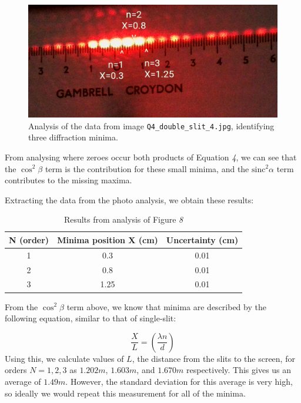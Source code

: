 \documentclass[a4paper]{article}
\begin{document}
\begin{figure}[h!]
\centerline{\includegraphics[scale=0.95]{doubleslit.png}}
\caption{Analysis of the data from image {\lstinline$Q4_double_slit_4.jpg$}, identifying three diffraction minima.}
\label{fig:doubleslit}
\end{figure}

From analysing where zeroes occur both products of Equation \emph{4}, we can see that the $\cos^2\beta$ term is the contribution for these small minima, and the $\text{sinc}^2 \alpha$ term contributes to the missing maxima.

Extracting the data from the photo analysis, we obtain these results:

\begin{table}[h!]
\centering
\begin{tabular}{ccc}
\hline
N (order) & Minima position X (cm) & Uncertainty (cm)\\ \hline
1 & 0.3 & 0.01 \\
2 & 0.8 & 0.01 \\
3 & 1.25 & 0.01 \\
\end{tabular}
\caption{\label{tab:l116b_table}Results from analysis of Figure \emph{8}}
\end{table}
\newpage
From the $\cos^2\beta$ term above, we know that minima are described by the following equation, similar to that of single-slit:

\begin{equation}
\frac XL = \left(\frac{\lambda n}{d}\right)
\end{equation}
Using this, we calculate values of $L$, the distance from the slits to the screen, for orders $N=1, 2, 3$ as $1.202m$, $1.603m$, and $1.670m$ respectively. This gives us an average of $1.49m$. However, the standard deviation for this average is very high, so ideally we would repeat this measurement for all of the minima.
\end{document}
